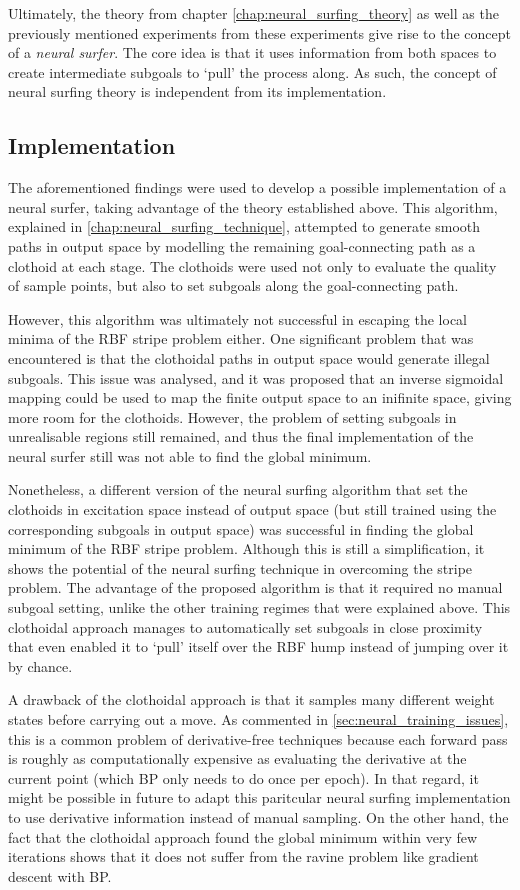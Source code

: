 Ultimately, the theory from chapter \ref{chap:neural_surfing_theory} as well as the previously mentioned experiments from these experiments give rise to the concept of a \textit{neural surfer}.
The core idea is that it uses information from both spaces to create intermediate subgoals to `pull' the process along.
As such, the concept of neural surfing theory is independent from its implementation.

\subsection{Implementation}
The aforementioned findings were used to develop a possible implementation of a neural surfer, taking advantage of the theory established above.
This algorithm, explained in \ref{chap:neural_surfing_technique}, attempted to generate smooth paths in output space by modelling the remaining goal-connecting path as a clothoid at each stage.
The clothoids were used not only to evaluate the quality of sample points, but also to set subgoals along the goal-connecting path.

However, this algorithm was ultimately not successful in escaping the local minima of the RBF stripe problem either.
One significant problem that was encountered is that the clothoidal paths in output space would generate illegal subgoals.
This issue was analysed, and it was proposed that an inverse sigmoidal mapping could be used to map the finite output space to an inifinite space, giving more room for the clothoids.
However, the problem of setting subgoals in unrealisable regions still remained, and thus the final implementation of the neural surfer still was not able to find the global minimum.

Nonetheless, a different version of the neural surfing algorithm that set the clothoids in excitation space instead of output space (but still trained using the corresponding subgoals in output space) was successful in finding the global minimum of the RBF stripe problem.
Although this is still a simplification, it shows the potential of the neural surfing technique in overcoming the stripe problem.
The advantage of the proposed algorithm is that it required no manual subgoal setting, unlike the other training regimes that were explained above.
This clothoidal approach manages to automatically set subgoals in close proximity that even enabled it to `pull' itself over the RBF hump instead of jumping over it by chance.

A drawback of the clothoidal approach is that it samples many different weight states before carrying out a move.
As commented in \ref{sec:neural_training_issues}, this is a common problem of derivative-free techniques because each forward pass is roughly as computationally expensive as evaluating the derivative at the current point (which BP only needs to do once per epoch).
In that regard, it might be possible in future to adapt this paritcular neural surfing implementation to use derivative information instead of manual sampling.
On the other hand, the fact that the clothoidal approach found the global minimum within very few iterations shows that it does not suffer from the ravine problem like gradient descent with BP.

